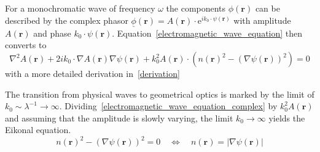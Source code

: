 For a monochromatic wave of frequency \(\omega \) the components \(\phi(\bm{r})\) can be described by the complex phasor \(\underline{\phi}(\bm{r}) = A(\bm{r}) \cdot \mathrm{e}^{i k_0 \cdot \psi(\bm{r})}\) with amplitude \(A(\bm{r})\) and phase \(k_0 \cdot \psi(\bm{r})\).
Equation~\eqref{electromagnetic_wave_equation} then converts to 
\begin{equation}\label{electromagnetic_wave_equation_complex}
    \nabla^2 A(\bm{r}) + 2ik_0 \cdot \nabla A(\bm{r}) \nabla \psi(\bm{r}) + k_0^2 A(\bm{r}) \cdot ({n(\bm{r})}^2 - {(\nabla \psi(\bm{r}))}^2) = 0
\end{equation}
with a more detailed derivation in~\ref{derivation}

The transition from physical waves to geometrical optics is marked by the limit of \(k_0 \sim  \lambda^{-1} \rightarrow \infty \).
Dividing~\eqref{electromagnetic_wave_equation_complex} by \(k_0^2 A(\bm{r})\) and assuming that the amplitude is slowly varying, the limit \(k_0 \rightarrow \infty \) yields the Eikonal equation.
\begin{equation}
    {n(\bm{r})}^2 - {(\nabla \psi(\bm{r}))}^2 = 0 \quad \Leftrightarrow \quad n(\bm{r}) = |\nabla \psi(\bm{r})|
\end{equation}


